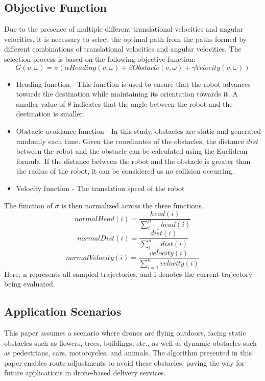 \documentclass[crop=false]{standalone}
\begin{document}
	\subsection{Objective Function}
	Due to the presence of multiple different translational velocities and angular velocities, it is necessary to select the optimal path from the paths formed by different combinations of translational velocities and angular velocities. The selection process is based on the following objective function:
	\begin{equation}
		G(v, \omega)=\sigma(\alpha Heading(v, \omega) + \beta Obstacle(v, \omega) + \gamma Velocity(v, \omega))
	\end{equation}
	\begin{itemize}
		\item Heading function - This function is used to ensure that the robot advances towards the destination while maintaining its orientation towards it. A smaller value of $\theta$ indicates that the angle between the robot and the destination is smaller.
		\item Obstacle avoidance function - In this study, obstacles are static and generated randomly each time. Given the coordinates of the obstacles, the distance $dist$ between the robot and the obstacle can be calculated using the Euclidean formula. If the distance between the robot and the obstacle is greater than the radius of the robot, it can be considered as no collision occurring.
		\item Velocity function - The translation speed of the robot
	\end{itemize}
	
	The function of $\sigma$ is then normalized across the three functions.
	\begin{equation}
		normalHead(i)=\frac{head(i)}{\sum_{i=1}^{n}{head(i)}}
	\end{equation}
	\begin{equation}
		normalDist(i)=\frac{dist(i)}{\sum_{i=1}^{n}{dist(i)}}
	\end{equation}
	\begin{equation}
		normalVelocity(i)=\frac{velocity(i)}{\sum_{i=1}^{n}{velocity(i)}}
	\end{equation}
	Here, n represents all sampled trajectories, and i denotes the current trajectory being evaluated.
	
	\subsection{Application Scenarios}
	This paper assumes a scenario where drones are flying outdoors, facing static obstacles such as flowers, trees, buildings, etc., as well as dynamic obstacles such as pedestrians, cars, motorcycles, and animals. The algorithm presented in this paper enables route adjustments to avoid these obstacles, paving the way for future applications in drone-based delivery services.
\end{document}
